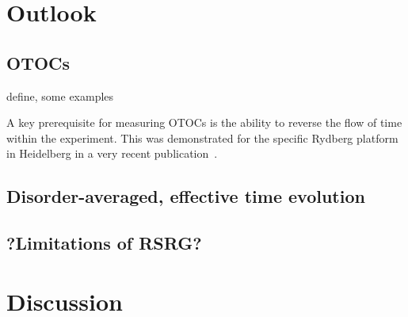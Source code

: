 \chapter{Outlook}
\section{OTOCs}
define, some examples

A key prerequisite for measuring OTOCs is the ability to reverse the flow of time within the experiment. This was demonstrated for the specific Rydberg platform in Heidelberg in a  very recent publication~\cite{geierTimereversalDipolarQuantum2024}.

\cite{muellenbachOTOC}

\section{Disorder-averaged, effective time evolution}


\section{?Limitations of RSRG?}


\chapter{Discussion}
